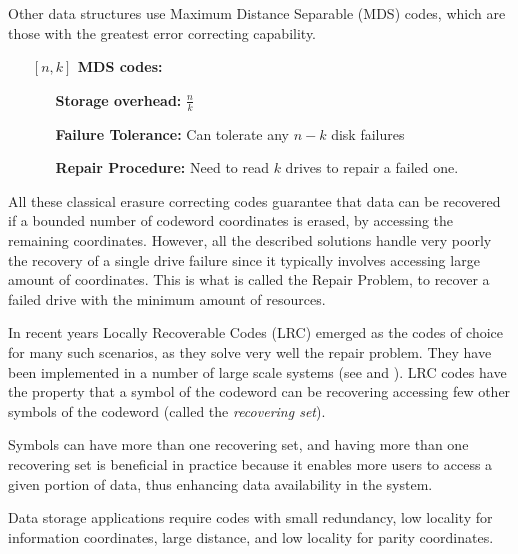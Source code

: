 Other data structures use Maximum Distance Separable (MDS) codes, which are those with the greatest error correcting capability.
\begin{itemize}[align = left, leftmargin=*]
\item[\textbf{$[n,k]$ MDS codes:}] \
    \begin{itemize}[align = left, leftmargin=*]
        \item[\textbf{Storage overhead:}] $\frac{n}{k}$
        \item[\textbf{Failure Tolerance:}] Can tolerate any $n-k$ disk failures
        \item[\textbf{Repair Procedure:}] Need to read $k$ drives to repair a failed one.
    \end{itemize}
\end{itemize}

All these classical erasure correcting codes guarantee that data can be recovered if a bounded number of codeword coordinates is erased, by accessing the remaining coordinates. However, all the described solutions handle very poorly the recovery of a single drive failure since it typically involves accessing large amount of coordinates. This is what is called the Repair Problem, to recover a failed drive with the minimum amount of resources.

In recent years Locally Recoverable Codes (LRC) emerged as the codes of choice for many such scenarios, as they solve very well the repair problem. They have been implemented in a number of large scale systems (see \cite{azure} and \cite{hadoop}). LRC codes have the property that a symbol of the codeword can be recovering accessing few other symbols of the codeword (called the \textit{recovering set}).

Symbols can have more than one recovering set, and having more than one recovering set is beneficial in practice because it enables more users to access a given portion of data, thus enhancing data availability in the system.

Data storage applications require codes with small redundancy, low locality for information coordinates, large distance, and low locality for parity coordinates.